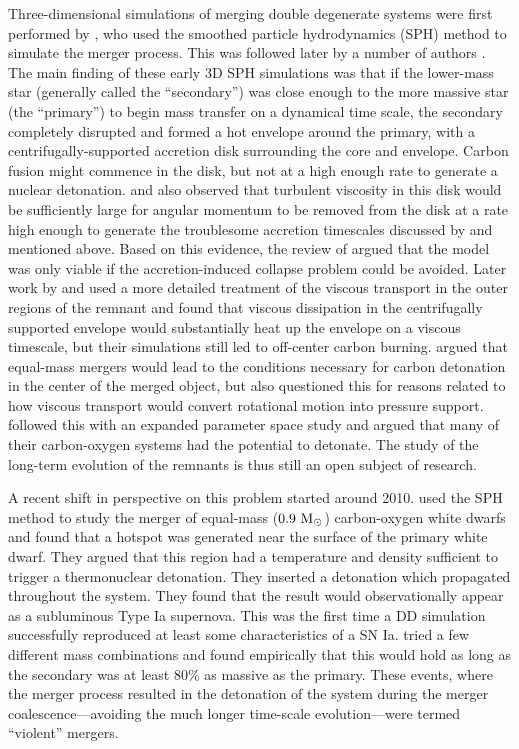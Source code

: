 \documentclass[12pt]{article}
\begin{document}
Three-dimensional simulations of merging double degenerate systems were
first performed by \citet{benz:1990}, who used the smoothed particle
hydrodynamics (SPH) method to simulate the merger process. This was
followed later by a number of authors
\citep{rasio-shapiro:1995,segretain:1997,guerrero:2004,yoon:2007,loren-aguilar:2009,raskin:2012}.
The main finding of these early 3D SPH simulations was that if the
lower-mass star (generally called the ``secondary'') was
close enough to the more massive star (the ``primary'') to begin mass
transfer on a dynamical time scale, the secondary completely disrupted
and formed a hot envelope around the primary, with a
centrifugally-supported accretion disk surrounding the core and
envelope. Carbon fusion might commence in the disk, but not at a
high enough rate to generate a nuclear detonation. \cite{mochkovitch-livio:1990}
and \cite{livio:2000}  also observed that turbulent viscosity in this disk
would be sufficiently large for angular momentum to be removed from the
disk at a rate high enough to generate the troublesome accretion
timescales discussed by \cite{tutukov-yungelson:1979} and mentioned above. Based on this
evidence, the review of \cite{hillebrandtniemeyer2000} argued that the
model was only viable if the accretion-induced collapse problem could
be avoided. Later work by \cite{shen:2012} and \cite{schwab:2012} used
a more detailed treatment of the viscous transport in the outer
regions of the remnant and found that viscous dissipation in the centrifugally
supported envelope would substantially heat up the envelope on a
viscous timescale, but their simulations still led to off-center carbon
burning. \cite{vankerkwijk:2010} argued that equal-mass mergers would
lead to the conditions necessary for carbon detonation in the center
of the merged object, but \cite{shen:2012} also questioned this for
reasons related to how viscous transport would convert rotational
motion into pressure support. \cite{zhu:2013} followed this with an
expanded parameter space study and argued that many of their
carbon-oxygen systems had the potential to detonate. The study of the
long-term evolution of the remnants is thus still an open subject of
research.

A recent shift in perspective on this problem started around 2010.
\cite{pakmor:2010} used the SPH method to study the merger of
equal-mass ($0.9\ \mathrm{M}_\odot$) carbon-oxygen white dwarfs and found
that a hotspot was generated near the surface of the primary
white dwarf. They argued that this region had a temperature
and density sufficient to trigger a thermonuclear
detonation. They inserted a detonation which propagated throughout
the system. They found that the result would observationally
appear as a subluminous Type Ia supernova. This was the first time
a DD simulation successfully reproduced at least some characteristics of a SN
Ia. \cite{pakmor:2011} tried a few different mass combinations and
found empirically that this would hold as long as the secondary was at
least 80\% as massive as the primary. These events, where the merger
process resulted in the detonation of the system during the merger
coalescence---avoiding the much longer time-scale evolution---were
termed ``violent'' mergers.
\end{document}

